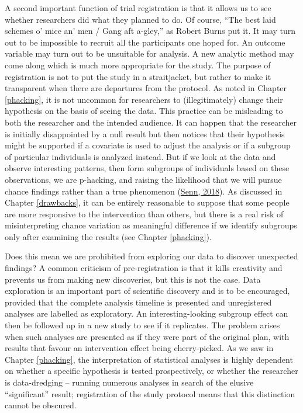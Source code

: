 \documentclass{krantz}
\begin{document}
A second important function of trial registration is that it allows us to see whether researchers did what they planned to do. Of course, ``The best laid schemes o' mice an' men / Gang aft a-gley,'' as Robert Burns put it. It may turn out to be impossible to recruit all the participants one hoped for. An outcome variable may turn out to be unsuitable for analysis. A new analytic method may come along which is much more appropriate for the study. The purpose of registration is not to put the study in a straitjacket, but rather to make it transparent when there are departures from the protocol. As noted in Chapter \ref{phacking}, it is not uncommon for researchers to (illegitimately) change their hypothesis on the basis of seeing the data. This practice can be misleading to both the researcher and the intended audience. It can happen that the researcher is initially disappointed by a null result but then notices that their hypothesis might be supported if a covariate is used to adjust the analysis or if a subgroup of particular individuals is analyzed instead. But if we look at the data and observe interesting patterns, then form subgroups of individuals based on these observations, we are p-hacking, and raising the likelihood that we will pursue chance findings rather than a true phenomenon (\protect\hyperlink{ref-senn2018}{Senn, 2018}). As discussed in Chapter \ref{drawbacks}, it can be entirely reasonable to suppose that some people are more responsive to the intervention than others, but there is a real risk of misinterpreting chance variation as meaningful difference if we identify subgroups only after examining the results (see Chapter \ref{phacking}).

Does this mean we are prohibited from exploring our data to discover unexpected findings? A common criticism of pre-registration is that it kills creativity and prevents us from making new discoveries, but this is not the case. Data exploration is an important part of scientific discovery and is to be encouraged, provided that the complete analysis timeline is presented and unregistered analyses are labelled as exploratory. An interesting-looking subgroup effect can then be followed up in a new study to see if it replicates. The problem arises when such analyses are presented as if they were part of the original plan, with results that favour an intervention effect being cherry-picked. As we saw in Chapter \ref{phacking}, the interpretation of statistical analyses is highly dependent on whether a specific hypothesis is tested prospectively, or whether the researcher is data-dredging -- running numerous analyses in search of the elusive ``significant'' result; registration of the study protocol means that this distinction cannot be obscured.
\end{document}
